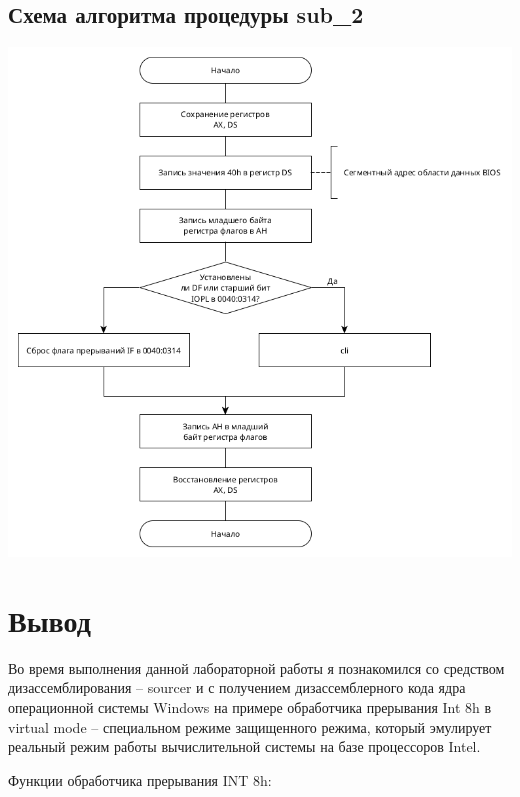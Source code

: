 \documentclass[14pt, a4paper]{article}
\begin{document}
	\pagebreak
	
	\subsection*{Схема алгоритма процедуры sub\_2}
	
	\bigbreak
	
	\begin{minipage}{0.9\linewidth}
		\includegraphics[width=\linewidth]{diagram2}
	\end{minipage}
	
	\pagebreak
	
	\section*{Вывод}
	
	Во время выполнения данной лабораторной работы я познакомился со средством дизассемблирования – sourcer и с получением дизассемблерного кода ядра операционной системы Windows на примере обработчика прерывания Int 8h в virtual mode – специальном режиме защищенного режима, который эмулирует реальный режим работы вычислительной системы на базе процессоров Intel.
	
	Функции обработчика прерывания INT 8h:
	
\end{document}
